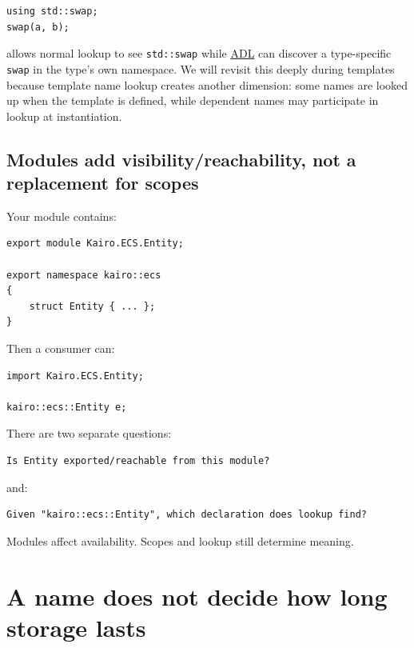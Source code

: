 \begin{verbatim}
using std::swap;
swap(a, b);
\end{verbatim}

allows normal lookup to see \texttt{std::swap} while \hyperref[appendix-7863714aa97f]{ADL} can discover a type-specific \texttt{swap} in the type's own namespace. We will revisit this deeply during templates because template name lookup creates another dimension: some names are looked up when the template is defined, while dependent names may participate in lookup at instantiation.

\subsection{Modules add visibility/reachability, not a replacement for scopes}\label{01-foundations-i-ch002-modules-add-visibilityreachability-not-a-replacement-for-scopes}

Your module contains:

\begin{verbatim}
export module Kairo.ECS.Entity;

export namespace kairo::ecs
{
    struct Entity { ... };
}
\end{verbatim}

Then a consumer can:

\begin{verbatim}
import Kairo.ECS.Entity;

kairo::ecs::Entity e;
\end{verbatim}

There are two separate questions:

\begin{verbatim}
Is Entity exported/reachable from this module?
\end{verbatim}

and:

\begin{verbatim}
Given "kairo::ecs::Entity", which declaration does lookup find?
\end{verbatim}

Modules affect availability. Scopes and lookup still determine meaning.

\section{A name does not decide how long storage lasts}\label{01-foundations-i-ch002-a-name-does-not-decide-how-long-storage-lasts}

